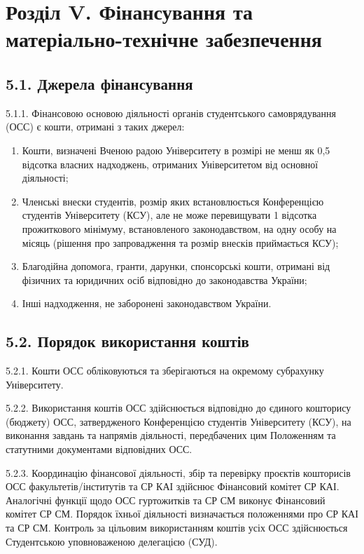 \section*{Розділ V. Фінансування та матеріально-технічне забезпечення}

\subsection*{5.1. Джерела фінансування}
    5.1.1. Фінансовою основою діяльності органів студентського самоврядування (ОСС) є кошти, отримані з таких джерел:
        \begin{enumerate}[label=\alph*)]
            \item Кошти, визначені Вченою радою Університету в розмірі не менш як 0,5 відсотка власних надходжень, отриманих Університетом від основної діяльності;
            \item Членські внески студентів, розмір яких встановлюється Конференцією студентів Університету (КСУ), але не може перевищувати 1 відсотка прожиткового мінімуму, встановленого законодавством, на одну особу на місяць (рішення про запровадження та розмір внесків приймається КСУ);
            \item Благодійна допомога, гранти, дарунки, спонсорські кошти, отримані від фізичних та юридичних осіб відповідно до законодавства України;
            \item Інші надходження, не заборонені законодавством України.
        \end{enumerate}

\subsection*{5.2. Порядок використання коштів}
    5.2.1. Кошти ОСС обліковуються та зберігаються на окремому субрахунку Університету.

    5.2.2. Використання коштів ОСС здійснюється відповідно до єдиного кошторису (бюджету) ОСС, затвердженого Конференцією студентів Університету (КСУ), на виконання завдань та напрямів діяльності, передбачених цим Положенням та статутними документами відповідних ОСС.

    5.2.3. Координацію фінансової діяльності, збір та перевірку проєктів кошторисів ОСС факультетів/інститутів та СР КАІ здійснює Фінансовий комітет СР КАІ. Аналогічні функції щодо ОСС гуртожитків та СР СМ виконує Фінансовий комітет СР СМ. Порядок їхньої діяльності визначається положеннями про СР КАІ та СР СМ. Контроль за цільовим використанням коштів усіх ОСС здійснюється Студентською уповноваженою делегацією (СУД).

